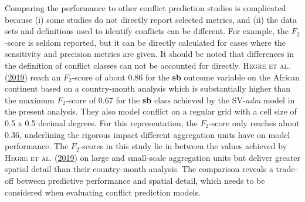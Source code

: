 \documentclass[a4paper,11pt]{article}
\begin{document}
Comparing the performance to other conflict prediction studies is complicated because
(i) some studies do not directly report selected metrics, and (ii) the data sets and
definitions used to identify conflicts can be different. For example,
the \(F_2\)-score is seldom reported, but it can be directly calculated for cases
where the sensitivity and precision metrics are given. It should be noted that
differences in the definition of conflict classes can not be accounted for directly.
\textsc{\textnormal{Hegre} \textnormal{et al.}} \textsc{(\textnormal{\protect\hyperlink{ref-hegre2019}{2019}})} reach an \(F_2\)-score of about 0.86 for the \textbf{sb} outcome variable on
the African continent based on a country-month analysis which is substantially
higher than the maximum \(F_2\)-score of 0.67 for the \textbf{sb} class achieved by the
SV-\emph{adm} model in the present analysis. They also model conflict on a regular grid
with a cell size of 0.5 x 0.5 decimal degrees. For this representation, the
\(F_2\)-score only reaches about 0.36, underlining the rigorous impact different
aggregation units have on model performance. The \(F_2\)-scores in this study lie
in between the values achieved by \textsc{\textnormal{Hegre} \textnormal{et al.}} \textsc{(\textnormal{\protect\hyperlink{ref-hegre2019}{2019}})} on large and small-scale aggregation
units but deliver greater spatial detail than their country-month analysis. The
comparison reveals a trade-off between predictive performance and spatial detail,
which needs to be considered when evaluating conflict prediction models.
\end{document}
